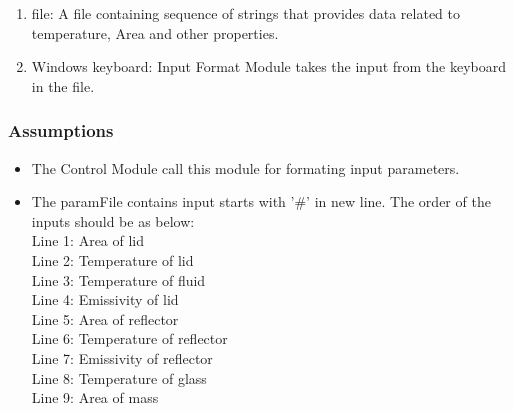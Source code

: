 \documentclass[12pt, titlepage]{article}
\begin{document}
\begin{enumerate}
    \item file: A file containing sequence of strings that provides data related to temperature, Area and other properties.
        \item Windows keyboard: Input Format Module takes the input from the keyboard in the file. 
\end{enumerate}


\subsubsection{Assumptions}

\begin{itemize}
    \item The Control Module call this module for formating input parameters. 
    \item The paramFile contains input starts with '\#' in new line. The order of the inputs should be as below: \\ 
    Line 1: Area of lid \\
    Line 2: Temperature of lid \\
    Line 3: Temperature of fluid \\
    Line 4: Emissivity of lid \\
    Line 5: Area of reflector \\ 
    Line 6: Temperature of reflector \\ 
    Line 7: Emissivity of reflector \\ 
    Line 8: Temperature of glass \\
    Line 9: Area of mass 
\end{itemize}
\end{document}
